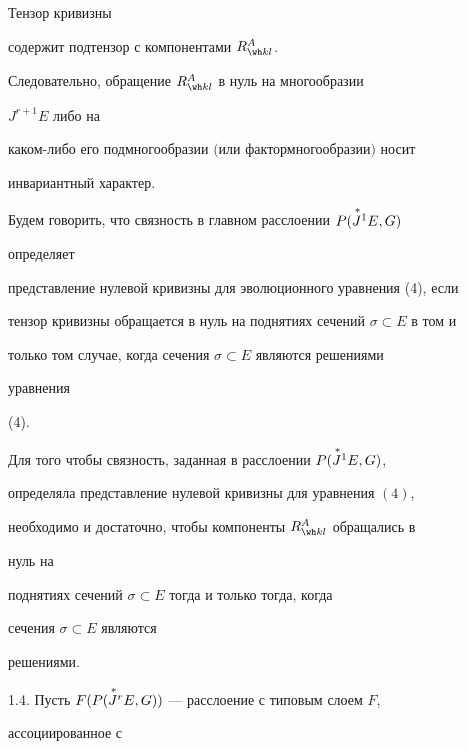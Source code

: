 \begin{lem} Тензор кривизны 


содержит подтензор с компонентами $R^A_{\wh k l}$. 


Следовательно, обращение $R^A_{\wh k l}$ в нуль на многообразии 


$J^{r+1}E$ либо на 


каком-либо его подмногообразии $($или фактормногообразии$)$ носит 


инвариантный характер. 


\end{lem} 


 


Будем говорить, что связность в главном расслоении $P(\overset{\,*}{J}{}^1E,G)$ 


определяет 


представление нулевой кривизны для эволюционного уравнения (4), если 


тензор кривизны обращается в нуль на поднятиях сечений $\sigma\subset 


E$ в том и 


только том случае, когда сечения $\sigma\subset E$ являются решениями 


уравнения 


(4). 


 


\begin{lem} 


Для того чтобы связность, заданная в расслоении $P(\overset{\,*}{J}{}^1E,G)$, 


определяла представление нулевой кривизны для уравнения $(4)$, 


необходимо и достаточно, чтобы компоненты $R^A_{\wh k l}$ обращались в 


нуль на 


поднятиях сечений $\sigma\subset E$ тогда и только тогда, когда 


сечения $\sigma\subset E$ являются 


решениями. 


\end{lem} 


 


1.4. Пусть $F(P(\overset{\,*}{J}{}^r E,G))$ --- расслоение с типовым слоем $F$, 


ассоциированное с 



